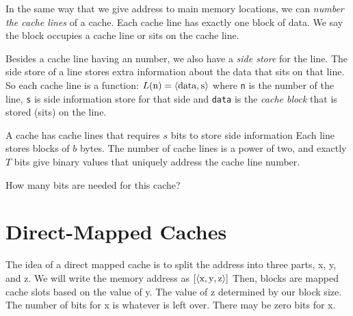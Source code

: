 In the same way that we give address to main memory locations, 
we can \textit{number the cache lines} of a cache. 
Each cache line has exactly one block of data.
We say the block occupies a cache line or sits on the cache line. 

Besides a cache line having an number, we also have a \textit{side store} for the 
line. The side store of a line stores extra information about the data that sits 
on that line. So each cache line is a function: 
$L(\text{\lstinline{n}}) =
\langle \text{\lstinline{data}}, \text{\lstinline{s}} \rangle$
where \lstinline{n} is the number of the line,
\lstinline{s} is side information store for that side and
\lstinline{data} is the \textit{cache block} that is stored (sits) on the line.

\begin{example}
A cache has cache lines that requires $s$ bits to store side information 
Each line stores blocks of $b$ bytes.
The number of cache lines is a power of two, and exactly $T$ bits 
give binary values that uniquely address the cache line number. 

How many bits are needed for this cache?
\end{example}




\section{Direct-Mapped Caches}



\begin{figure}[h]
\end{figure} 

\frmrule

The idea of a direct mapped cache is to split the address into three parts, 
x, y, and z. We will write the memory address as 
$[\langle \text{\lstinline{x}},\text{\lstinline{y}},\text{\lstinline{z}} \rangle]$
Then, blocks are mapped cache slots based on the 
value of y. The value of z determined by our block size. 
The number of bits for x is whatever is left over. There may be zero bits for x.

